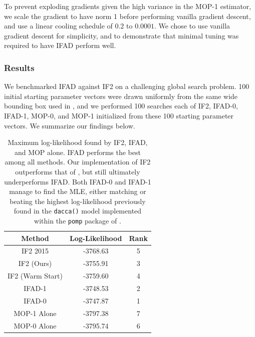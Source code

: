 \documentclass{article}
\begin{document}
To prevent exploding gradients given the high variance in the MOP-1 estimator, we scale the gradient to have norm 1 before performing vanilla gradient descent, and use a linear cooling schedule of $0.2$ to $ 0.0001$. We chose to use vanilla gradient descent for simplicity, and to demonstrate that minimal tuning was required to have IFAD perform well. 



\subsubsection{Results} 
We benchmarked IFAD against IF2 on a challenging global search problem. 100 initial starting parameter vectors were drawn uniformly from the same wide bounding box used in \cite{ionides15}, and we performed 100 searches each of IF2, IFAD-0, IFAD-1, MOP-0, and MOP-1 initialized from these 100 starting parameter vectors. We summarize our findings below. 

\begin{table}[h!]
\centering
\begin{tabular}{||c c c||} 
 \hline
 Method & Log-Likelihood & Rank \\ [0.5ex] 
 \hline\hline
 IF2 2015 & -3768.63 & 5\\ 
 IF2 (Ours) & -3755.91 & 3\\
 IF2 (Warm Start) & -3759.60 & 4 \\
 IFAD-1 & -3748.53 & 2\\
 IFAD-0 & -3747.87 & 1\\
 MOP-1 Alone & -3797.38 & 7\\
 MOP-0 Alone & -3795.74 & 6\\
 \hline
\end{tabular}
\caption{Maximum log-likelihood found by IF2, IFAD, and MOP alone. IFAD performs the best among all methods. Our implementation of IF2 outperforms that of \cite{ionides15}, but still ultimately underperforms IFAD. Both IFAD-0 and IFAD-1 manage to find the MLE, either matching or beating the highest log-likelihood previously found in the \texttt{dacca()} model implemented within the \texttt{pomp} package of \cite{king16}.}
\label{table:mle}
\end{table}
\end{document}
